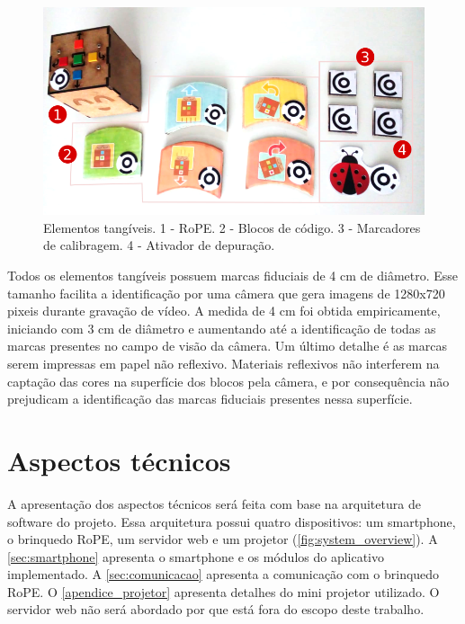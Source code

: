 \begin{figure}[!h]
\centering
        \includegraphics[width=.9\linewidth,fbox]{figs/tangible_elements.png}
        \caption{Elementos tangíveis. 1 - RoPE. 2 - Blocos de código. 3 - Marcadores de calibragem. 4 - Ativador de depuração.}
        \label{fig:tangible_elements}
\end{figure}
Todos os elementos tangíveis possuem marcas fiduciais de 4 cm de diâmetro. Esse tamanho facilita a identificação por uma câmera que gera imagens de 1280x720 pixeis durante gravação de vídeo. A medida de 4 cm foi obtida empiricamente, iniciando com 3 cm de diâmetro e aumentando até a identificação de todas as marcas presentes no campo de visão da câmera. Um último detalhe é as marcas serem impressas em papel não reflexivo. Materiais reflexivos não interferem na captação das cores na superfície dos blocos pela câmera, e por consequência não prejudicam a identificação das marcas fiduciais presentes nessa superfície. 

\section{Aspectos técnicos}
\label{sec:detalhes_tecnicos}
A apresentação dos aspectos técnicos será feita com base na arquitetura de software do projeto. Essa arquitetura possui quatro dispositivos: um smartphone, o brinquedo RoPE, um servidor web e um projetor (\autoref{fig:system_overview}).  A \autoref{sec:smartphone} apresenta o smartphone e os módulos do aplicativo implementado. A \autoref{sec:comunicacao} apresenta a comunicação com o brinquedo RoPE. O \autoref{apendice_projetor} apresenta detalhes do mini projetor utilizado. O servidor web não será abordado por que está fora do escopo deste trabalho.

